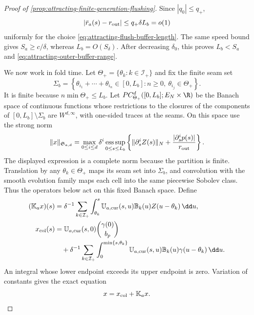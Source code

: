 \begin{proof}[Proof of
\cref{prop:attracting-finite-generation-flushing}]
Since \(|q_0|\le q_+\),
\[
 |\bar r_a(s)-r_{\rm out}|\le q_+\delta L_b=o(1)
\]
uniformly for the choice \cref{eq:attracting-flush-buffer-length}.  The same
speed bound gives \(S_a\ge c/\delta\), whereas
\(L_b=O(S_\delta)\).  After decreasing \(\delta_0\), this proves
\(L_b<S_a\) and \cref{eq:attracting-outer-buffer-range}.

We now work in fold time.  Let \(\Theta_+=\{\theta_k:k\in\mathcal I_+\}\)
and fix the finite seam set
\begin{equation*}
 \Sigma_b=\left\{\theta_{i_1}+\cdots+\theta_{i_n}\in[0,L_b]:
        n\ge0,\ \theta_{i_j}\in\Theta_+\right\}.
\end{equation*}
It is finite because
\(n\min\Theta_+\le L_b\).  Let
\(PC_{\Theta_+}^d([0,L_b];E_N\times\R)\) be the Banach space of continuous
functions whose restrictions to the closures of the components of
\([0,L_b]\setminus\Sigma_b\) are \(W^{d,\infty}\), with one-sided traces at
the seams.  On this space use the strong norm
\begin{equation}
 \|x\|_{\mathfrak S_{a,d}}
 =\max_{0\le i\le d}\delta^i
   \operatorname*{ess\,sup}_{0\le s\le L_b}
   \left\{\|\partial_s^iZ(s)\|_N
             +\frac{|\partial_s^ip(s)|}{r_{\rm out}}\right\}.   \label{eq:attracting-piecewise-strong-norm}
\end{equation}
The displayed expression is a complete norm because the partition is
finite.  Translation by any \(\theta_k\in\Theta_+\) maps its seam set into
\(\Sigma_b\), and convolution with the smooth evolution family maps each
cell into the same piecewise Sobolev class.  Thus the operators below act on
this fixed Banach space.  Define
\begin{align}
 (\mathbb K_ax)(s)
 &=
 \delta^{-1}\sum_{k\in\mathcal I_+}
 \int_{\theta_k}^{s}
   \mathbb U_{a,\rm cur}(s,u)\mathbb B_k(u)
                 Z(u-\theta_k)\,\dd u,            \label{eq:attracting-generation-operator}\\
 x_{\rm col}(s)
 &=
 \mathbb U_{a,\rm cur}(s,0)\binom{\gamma(0)}{b_p}\notag\\
 &\quad+
 \delta^{-1}\sum_{k\in\mathcal I_+}
 \int_0^{\min\{s,\theta_k\}}
   \mathbb U_{a,\rm cur}(s,u)\mathbb B_k(u)
                 \gamma(u-\theta_k)\,\dd u.       \label{eq:attracting-direct-collar-term}
\end{align}
An integral whose lower endpoint exceeds its upper endpoint is zero.
Variation of constants gives the exact equation
\begin{equation}
 x=x_{\rm col}+\mathbb K_ax.                      \label{eq:attracting-generation-fixed-point}
\end{equation}


\end{proof}
